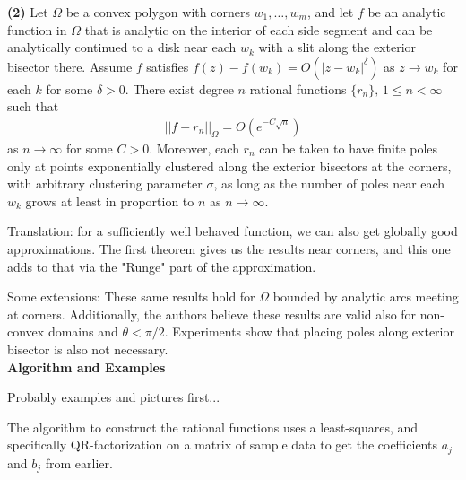 \documentclass[12]{article}
\begin{document}
	\textbf{(2)} Let $\Omega$ be a convex polygon with corners $w_1 , \ldots , w_m$, and let $f$ be an analytic function in $\Omega$ that is analytic on the interior of each side segment and can be analytically continued to a disk near each $w_k$ with a slit along the exterior bisector there. Assume $f$ satisfies $f(z)-f(w_k)=O(|z-w_k|^\delta)$ as $z \to w_k$ for each $k$ for some $\delta >0$. There exist degree $n$ rational functions $\{r_n\},\, 1 \leq n < \infty$ such that
	\begin{align*}
	||f-r_n||_\Omega=O(e^{-C\sqrt{n}})
	\end{align*}
as $n\to \infty$ for some $C>0$. Moreover, each $r_n$ can be taken to have finite poles only at points exponentially clustered along the exterior bisectors at the corners, with arbitrary clustering parameter $\sigma$, as long as the number of poles near each $w_k$ grows at least in proportion to $n$ as $n\to \infty$.

	Translation: for a sufficiently well behaved function, we can also get globally good approximations. The first theorem gives us the results near corners, and this one adds to that via the "Runge" part of the approximation.
	
	Some extensions: These same results hold for $\Omega$ bounded by analytic arcs meeting at corners. Additionally, the authors believe these results are valid also for non-convex domains and $\theta < \pi /2$. Experiments show that placing poles along exterior bisector is also not necessary.\\
	
\noindent
\textbf{Algorithm and Examples}

	Probably examples and pictures first...
	
	The algorithm to construct the rational functions uses a least-squares, and specifically QR-factorization on a matrix of sample data to get the coefficients $a_j$ and $b_j$ from earlier.
	
\end{document}

